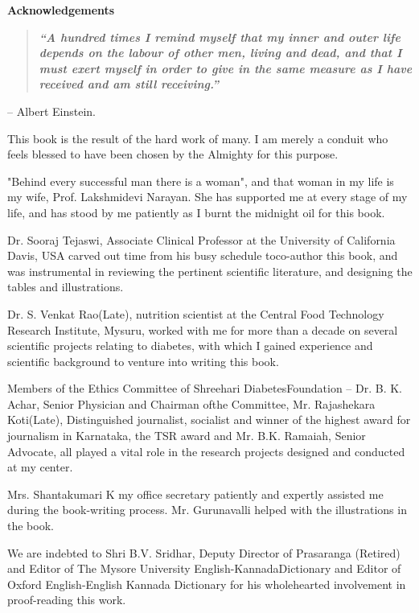 \thispagestyle{empty}

\begin{center}
\Huge\textbf{Acknowledgements}
\end{center}

\vskip 20pt

{{\setlength{\parskip}{.5em}

\begin{quote}
\textbf{\textit{“A hundred times I remind myself that my inner and outer life depends on the labour of other men, living and dead, and that I must exert myself in order to give in the same measure as I have received and am still receiving.”}}
\end{quote}
\hfill{– Albert Einstein.}

This book is the result of the hard work of many. I am merely a conduit who feels blessed to have been chosen by the Almighty for this purpose.

"Behind every successful man there is a woman", and that woman in my life is my wife, Prof. Lakshmidevi Narayan. She has supported me at every stage of my life, and has stood by me patiently as I burnt the midnight oil for this book.

Dr. Sooraj Tejaswi, Associate Clinical Professor at the University of California Davis, USA carved out time from his busy schedule to\break co-author this book, and was instrumental in reviewing the pertinent scientific literature, and designing the tables and illustrations.

Dr. S. Venkat Rao(Late), nutrition scientist at the Central Food Technology Research Institute, Mysuru, worked with me for more than a decade on several scientific projects relating to diabetes, with which I gained experience and scientific background to venture into writing this book.

Members of the Ethics Committee of Shreehari Diabetes\break Foundation – Dr. B. K. Achar, Senior Physician and Chairman of\break the Committee, Mr. Rajashekara Koti(Late), Distinguished journalist, socialist and winner of the highest award for journalism in Karnataka, the TSR award and Mr. B.K. Ramaiah, Senior Advocate, all played a vital role in the research projects designed and conducted at my center.}

{\setlength{\parskip}{.2em}
Mrs. Shantakumari K my office secretary patiently and expertly assisted me during the book-writing process. Mr. Gurunavalli helped with the illustrations in the book.

We are indebted to Shri B.V. Sridhar, Deputy Director of Prasaranga (Retired) and Editor of The Mysore University English-Kannada\break Dictionary and Editor of Oxford English-English Kannada Dictionary for his wholehearted involvement in proof-reading this work.

}}
